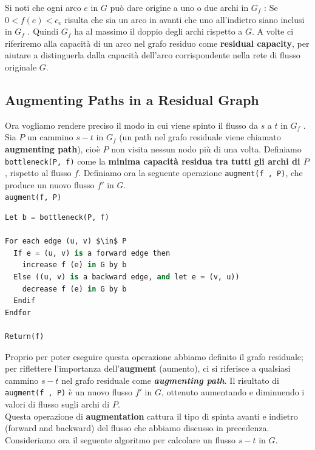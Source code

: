 Si noti che ogni arco $e$ in $G$ può dare origine a uno o due archi
in $G_f$ : Se $0 < f (e) < c_e$ risulta che sia un arco in avanti
che uno all'indietro siano inclusi in $G_f$ . Quindi $G_f$ ha al
massimo il doppio degli archi rispetto a $G$. A volte ci riferiremo
alla capacità di un arco nel grafo residuo come \textbf{residual
capacity}, per aiutare a distinguerla dalla capacità dell'arco
corrispondente nella rete di flusso originale $G$.


\subsection{Augmenting Paths in a Residual Graph}

Ora vogliamo rendere preciso il modo in cui viene spinto il flusso da
$s$ a $t$ in $G_f$ . Sia $P$ un cammino $s-t$ in $G_f$ (un
path nel grafo residuale viene chiamato \textbf{augmenting path}), cioè
$P$ non visita nessun nodo più di una volta. Definiamo
\texttt{bottleneck(P,\ f)} come la \textbf{minima capacità residua tra
tutti gli archi di $P$}, rispetto al flusso $f$. Definiamo ora la
seguente operazione \texttt{augment(f\ ,\ P)}, che produce un nuovo
flusso $f'$ in $G$.\\

\texttt{augment(f, P)}

\begin{lstlisting}[language=Python, mathescape=true]
 Let b = bottleneck(P, f)

For each edge (u, v) $\in$ P
  If e = (u, v) is a forward edge then
    increase f (e) in G by b
  Else ((u, v) is a backward edge, and let e = (v, u))
    decrease f (e) in G by b
  Endif
Endfor

Return(f)

\end{lstlisting}

Proprio per poter eseguire questa operazione abbiamo deﬁnito il grafo
residuale; per riflettere l'importanza dell'\textbf{augment} (aumento),
ci si riferisce a qualsiasi cammino $s-t$ nel grafo residuale come
\textbf{\emph{augmenting path}}. Il risultato di
\texttt{augment(f\ ,\ P)} è un nuovo flusso $f'$ in $G$, ottenuto
aumentando e diminuendo i valori di flusso sugli archi di $P$.\\

Questa operazione di \textbf{augmentation} cattura il tipo di spinta
avanti e indietro (forward and backward) del flusso che abbiamo discusso
in precedenza. Consideriamo ora il seguente algoritmo per calcolare un
flusso $s-t$ in $G$.\\

